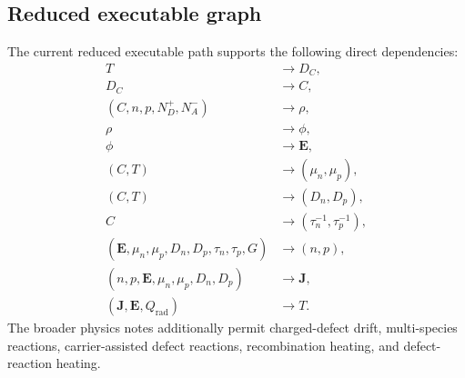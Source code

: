 \documentclass[11pt]{article}
\newcommand{\Evec}{\bm{E}}
\newcommand{\Jvec}{\bm{J}}
\begin{document}
\subsection{Reduced executable graph}

The current reduced executable path supports the following direct dependencies:
\begin{align}
T &\rightarrow D_C,\\
D_C &\rightarrow C,\\
(C,n,p,N_D^+,N_A^-) &\rightarrow \rho,\\
\rho &\rightarrow \phi,\\
\phi &\rightarrow \Evec,\\
(C,T) &\rightarrow (\mu_n,\mu_p),\\
(C,T) &\rightarrow (D_n,D_p),\\
C &\rightarrow (\tau_n^{-1},\tau_p^{-1}),\\
(\Evec,\mu_n,\mu_p,D_n,D_p,\tau_n,\tau_p,G) &\rightarrow (n,p),\\
(n,p,\Evec,\mu_n,\mu_p,D_n,D_p) &\rightarrow \Jvec,\\
(\Jvec,\Evec,Q_{\mathrm{rad}}) &\rightarrow T.
\end{align}
The broader physics notes additionally permit charged-defect drift, multi-species reactions, carrier-assisted defect reactions, recombination heating, and defect-reaction heating.
\end{document}
